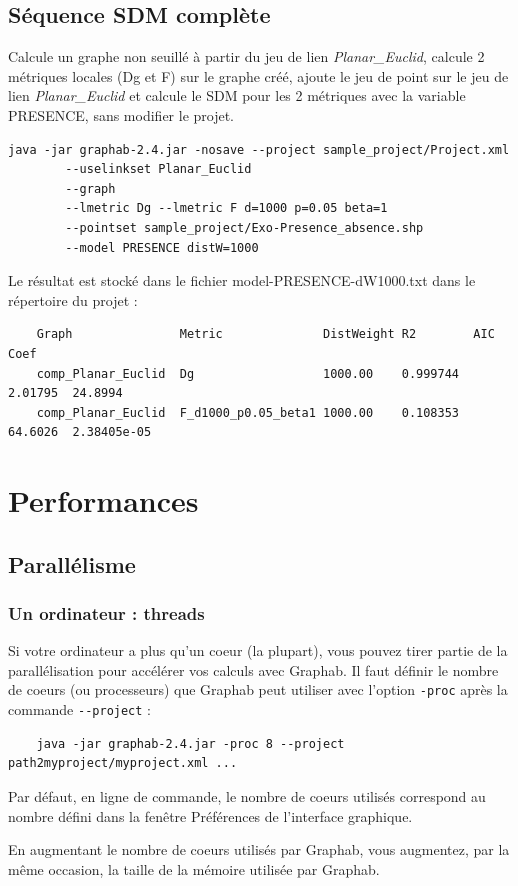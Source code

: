 \documentclass[a4paper,10pt]{report}
\begin{document}
\section{Séquence SDM complète}
Calcule un graphe non seuillé à partir du jeu de lien \textit{Planar\_Euclid}, calcule 2 métriques locales (Dg et F) sur le graphe créé, ajoute le jeu de point 
sur le jeu de lien \textit{Planar\_Euclid} et calcule le SDM pour les 2 métriques avec la variable PRESENCE, sans modifier le projet.
\begin{Verbatim}[tabsize=4]
	java -jar graphab-2.4.jar -nosave --project sample_project/Project.xml 
		--uselinkset Planar_Euclid 
		--graph 
		--lmetric Dg --lmetric F d=1000 p=0.05 beta=1 
		--pointset sample_project/Exo-Presence_absence.shp 
		--model PRESENCE distW=1000
\end{Verbatim}
Le résultat est stocké dans le fichier model-PRESENCE-dW1000.txt dans le répertoire du projet :
\begin{Verbatim}
	Graph               Metric              DistWeight R2        AIC      Coef
	comp_Planar_Euclid  Dg                  1000.00    0.999744  2.01795  24.8994
	comp_Planar_Euclid  F_d1000_p0.05_beta1 1000.00    0.108353  64.6026  2.38405e-05
\end{Verbatim}

\chapter{Performances}
\label{perf}
\section{Parallélisme}
\subsection{Un ordinateur : threads}
Si votre ordinateur a plus qu'un coeur (la plupart), vous pouvez tirer partie de la parallélisation pour accélérer vos calculs avec Graphab.
Il faut définir le nombre de coeurs (ou processeurs) que Graphab peut utiliser avec l'option \verb|-proc| après la commande \verb|--project| :
\begin{Verbatim}
	java -jar graphab-2.4.jar -proc 8 --project path2myproject/myproject.xml ...
\end{Verbatim}
Par défaut, en ligne de commande, le nombre de coeurs utilisés correspond au nombre défini dans la fenêtre Préférences de l'interface graphique.

En augmentant le nombre de coeurs utilisés par Graphab, vous augmentez, par la même occasion, la taille de la mémoire utilisée par Graphab.
\end{document}
